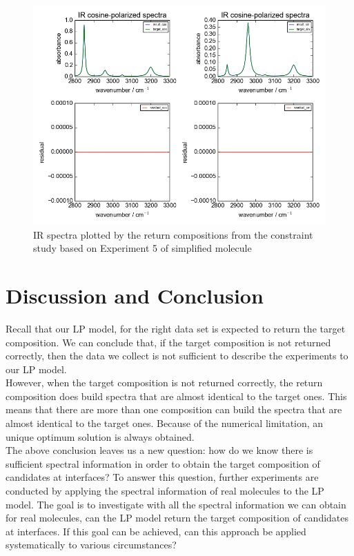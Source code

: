 \begin{figure}[!ht] 
\centering
\includegraphics[scale=0.7]{Figures/toy_model_result_plotting_ir_sin_10candi_constraint_study_experiment5.png} 
\caption{IR spectra plotted by the return compositions from the constraint study based on Experiment 5 of simplified molecule}\label{fig:3.6}
\end{figure}

\section{Discussion and Conclusion}

Recall that our LP model, for the right data set is expected to return the target composition. We can conclude that, if the target composition is not returned correctly, then the data we collect is not sufficient to describe the experiments to our LP model. \\

However, when the target composition is not returned correctly, the return composition does build spectra that are almost identical to the target ones. This means that there are more than one composition can build the spectra that are almost identical to the target ones. Because of the numerical limitation, an unique optimum solution is always obtained. \\

The above conclusion leaves us a new question: how do we know there is sufficient spectral information in order to obtain the target composition of candidates at interfaces? To answer this question, further experiments are conducted by applying the spectral information of real molecules to the LP model. The goal is to investigate with all the spectral information we can obtain for real molecules, can the LP model return the target composition of candidates at interfaces. If this goal can be achieved, can this approach be applied systematically to various circumstances?

